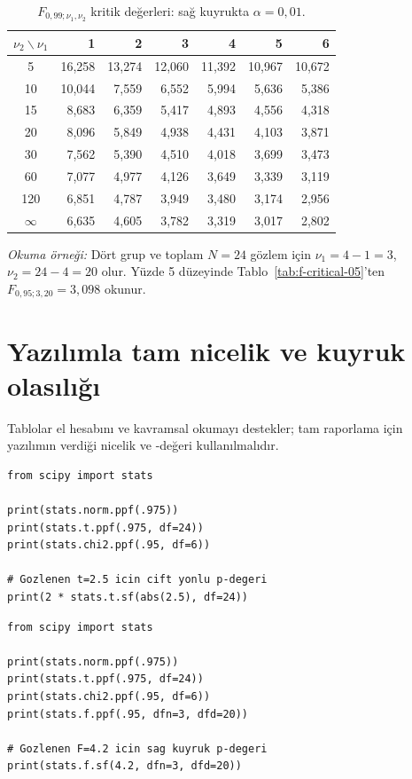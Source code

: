 \begin{table}[H]
\centering
\caption{$F_{0{,}99;\nu_1,\nu_2}$ kritik değerleri: sağ kuyrukta $\alpha=0{,}01$.}
\label{tab:f-critical-01}
\small
\begin{tabular}{crrrrrr}
\toprule
$\nu_2\backslash\nu_1$ & 1 & 2 & 3 & 4 & 5 & 6 \\
\midrule
5   & 16,258 & 13,274 & 12,060 & 11,392 & 10,967 & 10,672 \\
10  & 10,044 & 7,559 & 6,552 & 5,994 & 5,636 & 5,386 \\
15  & 8,683 & 6,359 & 5,417 & 4,893 & 4,556 & 4,318 \\
20  & 8,096 & 5,849 & 4,938 & 4,431 & 4,103 & 3,871 \\
30  & 7,562 & 5,390 & 4,510 & 4,018 & 3,699 & 3,473 \\
60  & 7,077 & 4,977 & 4,126 & 3,649 & 3,339 & 3,119 \\
120 & 6,851 & 4,787 & 3,949 & 3,480 & 3,174 & 2,956 \\
$\infty$ & 6,635 & 4,605 & 3,782 & 3,319 & 3,017 & 2,802 \\
\bottomrule
\end{tabular}
\end{table}

\textit{Okuma örneği:} Dört grup ve toplam $N=24$ gözlem için
$\nu_1=4-1=3$, $\nu_2=24-4=20$ olur. Yüzde 5 düzeyinde
Tablo~\ref{tab:f-critical-05}'ten $F_{0{,}95;3,20}=3{,}098$ okunur.
\fi

\section{Yazılımla tam nicelik ve kuyruk olasılığı}

Tablolar el hesabını ve kavramsal okumayı destekler; tam raporlama için
yazılımın verdiği nicelik ve \pval-değeri kullanılmalıdır.

\begin{softwarebox}
\ifimoders
\begin{lstlisting}
from scipy import stats

print(stats.norm.ppf(.975))
print(stats.t.ppf(.975, df=24))
print(stats.chi2.ppf(.95, df=6))

# Gozlenen t=2.5 icin cift yonlu p-degeri
print(2 * stats.t.sf(abs(2.5), df=24))
\end{lstlisting}
\else
\begin{lstlisting}
from scipy import stats

print(stats.norm.ppf(.975))
print(stats.t.ppf(.975, df=24))
print(stats.chi2.ppf(.95, df=6))
print(stats.f.ppf(.95, dfn=3, dfd=20))

# Gozlenen F=4.2 icin sag kuyruk p-degeri
print(stats.f.sf(4.2, dfn=3, dfd=20))
\end{lstlisting}
\fi
\end{softwarebox}